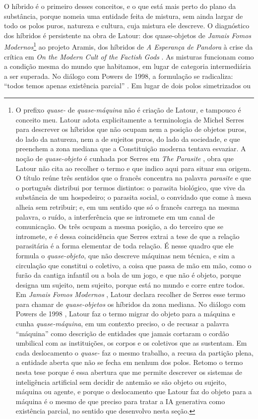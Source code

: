 O híbrido é o primeiro desses conceitos, e o que está mais perto do plano da substância, porque nomeia uma entidade feita de mistura, sem ainda largar de todo os polos puros, natureza e cultura, cuja mistura ele descreve. O diagnóstico dos híbridos é persistente na obra de Latour: dos quase-objetos de \textit{Jamais Fomos Modernos}\footnote{O prefixo \emph{quase-} de \emph{quase-máquina} não é criação de Latour, e tampouco é conceito meu. Latour adota explicitamente a terminologia de Michel Serres para descrever os híbridos que não ocupam nem a posição de objetos puros, do lado da natureza, nem a de sujeitos puros, do lado da sociedade, e que preenchem a zona mediana que a Constituição moderna tentava esvaziar. A noção de \emph{quase-objeto} é cunhada por Serres em \textit{The Parasite} \parencite{Serres1982Parasite}, obra que Latour não cita ao recolher o termo e que indico aqui para situar sua origem. O título reúne três sentidos que o francês concentra na palavra \textit{parasite} e que o português distribui por termos distintos: o parasita biológico, que vive da substância de um hospedeiro; o parasita social, o convidado que come à mesa alheia sem retribuir; e, em um sentido que só o francês carrega na mesma palavra, o ruído, a interferência que se intromete em um canal de comunicação. Os três ocupam a mesma posição, a do terceiro que se intromete, e é dessa coincidência que Serres extrai a tese de que a relação parasitária é a forma elementar de toda relação. É nesse quadro que ele formula o \emph{quase-objeto}, que não descreve máquinas nem técnica, e sim a circulação que constitui o coletivo, a coisa que passa de mão em mão, como o furão da cantiga infantil ou a bola de um jogo, e que não é objeto, porque designa um sujeito, nem sujeito, porque está no mundo e corre entre todos. Em \textit{Jamais Fomos Modernos} \parencite{Latour1994Jamais}, Latour declara recolher de Serres esse termo para chamar de \emph{quase-objetos} os híbridos da zona mediana. No diálogo com Powers de 1998 \parencite{Latour1998TwoWriters}, Latour faz o termo migrar do objeto para a máquina e cunha \emph{quase-máquina}, em um contexto preciso, o de recusar a palavra \enquote{máquina} como descrição de entidades que jamais cortaram o cordão umbilical com as instituições, os corpos e os coletivos que as sustentam. Em cada deslocamento o \emph{quase-} faz o mesmo trabalho, a recusa da partição plena, a entidade aberta que não se fecha em nenhum dos polos. Retomo o termo nesta tese porque é essa abertura que me permite descrever os sistemas de inteligência artificial sem decidir de antemão se são objeto ou sujeito, máquina ou agente, e porque o deslocamento que Latour faz do objeto para a máquina é o mesmo de que preciso para tratar a IA generativa como existência parcial, no sentido que desenvolvo nesta seção.} ao projeto Aramis, dos híbridos de \textit{A Esperança de Pandora} \parencite*{Latour2017Esperanca} à crise da crítica em \textit{On the Modern Cult of the Factish Gods} \parencite*{latour2010factish}. As misturas funcionam como a condição mesma do mundo que habitamos, em lugar de categoria intermediária a ser superada. No diálogo com Powers de 1998, a formulação se radicaliza: \enquote{todos temos apenas existência parcial} \parencite{Latour2008Powers}. Em lugar de dois polos simetrizados ou 